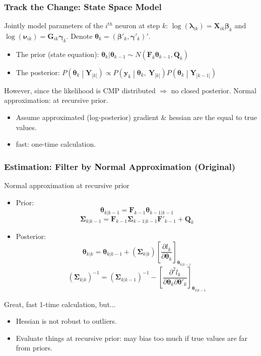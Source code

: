 \documentclass{beamer}
\begin{document}
	\begin{frame}
		\frametitle{Track the Change: State Space Model}
		Jointly model parameters of the $i^{th}$ neuron at step $k$: \(\log(\bm{\lambda}_{ik} ) = \bm{X}_{ik}\bm{\beta}_{k}\) and
		\(\log(\bm{\nu}_{ik}) = \bm{G}_{ik}\bm{\gamma}_{k}\). Denote \(\bm{\theta}_{k} = (\bm{\beta}'_{k},\bm{\gamma}'_{k})'\).
		\begin{itemize}
			\item 
			The prior (state equation): $\bm{\theta}_{k}|\bm{\theta}_{k-1}\sim N(\bm{F}_k\bm{\theta}_{k-1}, \bm{Q}_k)$
			\item
			The posterior:
			$P\left( \bm{\theta}_{k} \middle| \bm{Y}_{\lbrack k\rbrack} \right) \propto P\left( \bm{y}_{k} \middle| \bm{\theta}_{k},\ \bm{Y}_{\lbrack k\rbrack} \right)P\left( \bm{\theta}_{k} \middle| \bm{Y}_{\lbrack k - 1\rbrack} \right)$ 
		\end{itemize}
		However, since the likelihood is CMP distributed $\Rightarrow$ no closed posterior.
		Normal approximation: at recursive prior.
		\begin{itemize}
			\item 
			Assume approximated (log-posterior) gradient \& hessian are the equal to true values.
			\item
			fast: one-time calculation.
		\end{itemize}
	\end{frame}
	
	
	\begin{frame}
		\frametitle{Estimation: Filter by Normal Approximation (Original)}
		Normal approximation at recursive prior
		\begin{itemize}
			\item
			Prior:
			\[\bm{\theta}_{k|k - 1} = \bm{F}_{k - 1}\bm{\theta}_{k - 1|k - 1}\]
			\[\bm{\Sigma}_{k|k - 1} = \bm{F}_{k - 1}\bm{\Sigma}_{k - 1|k - 1}\bm{F}'_{k - 1} + \bm{Q}_{k}\]
			\item
			Posterior:
			\[\bm{\theta}_{k|k} = \bm{\theta}_{k|k - 1} + \left( \bm{\Sigma}_{k|k} \right)\left\lbrack \frac{\partial l_{k}}{\partial\bm{\theta}_{k}} \right\rbrack_{\bm{\theta}_{k|k - 1}}\]
			\[\left( \bm{\Sigma}_{k|k} \right)^{- 1} = \left( \bm{\Sigma}_{k|k - 1} \right)^{- 1} - \left\lbrack \frac{\partial^{2}l_{k}}{\partial\bm{\theta}_{k}\partial\bm{\theta}'_{k}} \right\rbrack_{\bm{\theta}_{k|k - 1}}\]
		\end{itemize}
		Great, fast 1-time calculation, but...
		\begin{itemize}
			\item
			Hessian is not robust to outliers.
			\item
			Evaluate things at recursive prior: may bias too much if true values are far from priors.
		\end{itemize}
	\end{frame}
	
\end{document}
